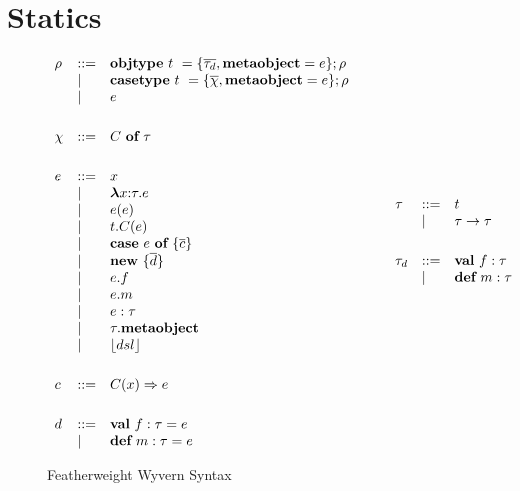 \section{Statics}

\begin{figure}
\centering
\[
\begin{array}{lll}
\rho & \bnfdef & \keyw{objtype}~ t~ = \{ \overline{\tau_d}, \keyw{metaobject}=e \}; \rho \\
     & \bnfalt & \keyw{casetype}~ t~ = \{ \overline{\chi}, \keyw{metaobject}=e \}; \rho\\
     & \bnfalt & e\\
     \\[1ex]
\chi & \bnfdef & C~\keyw{of}~\tau\\
\\[1ex]
e    & \bnfdef & x \\
     & \bnfalt & \boldsymbol\lambda x{:}\tau . e \\ %
     & \bnfalt & e(e) \\
     & \bnfalt & t.C(e) \\
     & \bnfalt & \keyw{case}~e~\keyw{of}~\{ \overline{c} \} \\
     & \bnfalt & \keyw{new}~ \{ \overline{d} \}\\
     & \bnfalt & e.f \\
     & \bnfalt & e.m \\
     & \bnfalt & e : \tau\\
     & \bnfalt & \tau.\keyw{metaobject}\\
     & \bnfalt & \lfloor dsl \rfloor \\
\\[1ex]
c    & \bnfdef & C(x) \Rightarrow e\\
	 \\[1ex]
d    & \bnfdef & \keyw{val}~ f:\tau = e \\
     & \bnfalt & \keyw{def}~ m:\tau = e 
\end{array}
\begin{array}{lll}
~~~~
\end{array}
\begin{array}{lll}
\tau & \bnfdef & t\\
     & \bnfalt & \tau \rightarrow \tau \\
\\[1ex]

\tau_d   & \bnfdef & \keyw{val}~ f:\tau\\
         & \bnfalt & \keyw{def}~ m:\tau \\
\\[1ex]
\end{array}
\]
\caption{Featherweight Wyvern Syntax}
\label{fig:core2-syntax}
\end{figure}


